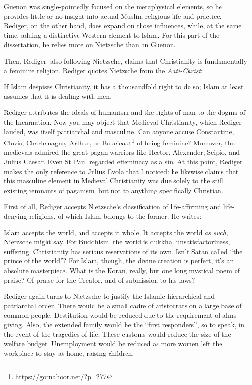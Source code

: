 Guenon was single-pointedly focused on the metaphysical elements, so he provides little or no insight into actual Muslim religious life and practice. Rediger, on the other hand, does expand on those influences, while, at the same time, adding a distinctive Western element to Islam. For this part of the dissertation, he relies more on Nietzsche than on Guenon.

Then, Rediger, also following Nietzsche, claims that Christianity is fundamentally a feminine religion. Rediger quotes Nietzsche from the
\emph{Anti-Christ}:


\begin{quotex}
If Islam despises Christianity, it has a thousandfold right to do so; Islam at least assumes that it is dealing with men.
\end{quotex}


Rediger attributes the ideals of humanism and the rights of man to the dogma of the Incarnation. Now you may object that Medieval Christianity, which Rediger lauded, was itself patriarchal and masculine. Can anyone accuse Constantine, Clovis, Charlemagne, Arthur, or Boucicaut\footnote{\url{https://gornahoor.net/?p=277}} of being feminine? Moreover, the medievals admired the great pagan warriors like Hector, Alexander, Scipio, and Julius Caesar. Even St Paul regarded effeminacy as a sin. At this point, Rediger makes the only reference to Julius Evola that I noticed: he likewise claims that this masculine element in Medieval Christianity was due solely to the still existing remnants of paganism, but not to anything specifically Christian.

First of all, Rediger accepts Nietzsche's classification of life-affirming and life-denying religions, of which Islam belongs to the former. He writes:

\begin{quotex}
Islam accepts the world, and accepts it whole. It accepts the world \emph{as such}, Nietzsche might say. For Buddhism, the world is dukkha, unsatisfactoriness, suffering. Christianity has serious reservations of its own. Isn't Satan called ``the prince of the world''? For Islam, though, the divine creation is perfect, it's an absolute masterpiece. What is the Koran, really, but one long mystical poem of praise? Of praise for the Creator, and of submission to his laws?
\end{quotex}


Rediger again turns to Nietzsche to justify the Islamic hierarchical and patriarchal order. There would be a small cadre of aristocrats on a large base of common people. Destitution would be reduced due to the requirement of alms-giving. Also, the extended family would be the ``first responders'', so to speak, in the event of the tragedies of life. These customs would reduce the size of the welfare budget. Unemployment would be reduced as more women left the workplace to stay at home, raising children.

